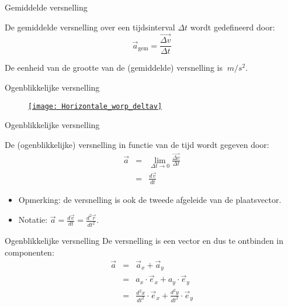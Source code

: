 \begin{frame}{Gemiddelde versnelling}
\begin{block}{}
De gemiddelde versnelling over een tijdsinterval $\Delta t$ wordt gedefineerd door:
\begin{displaymath}
	\vec{a}_{\text{gem}}=\frac{\vec{\Delta v}}{\Delta t}
\end{displaymath}
\end{block}
De eenheid van de grootte van de (gemiddelde) versnelling is $\SI{}{m/s^2}$.
\end{frame}


\begin{frame}{Ogenblikkelijke versnelling}
\begin{figure}
\href{run:./media/Horizontale_worp_deltav.gif}{%
\texttt{[image: Horizontale\_worp\_deltav]}
}
\end{figure}
\end{frame}



\begin{frame}{Ogenblikkelijke versnelling}
\begin{block}{}
De (ogenblikkelijke) versnelling in functie van de tijd wordt gegeven door:
\begin{eqnarray*}
	\vec{a}&=&\lim_{\Delta t\to0}\frac{\vec{\Delta v}}{\Delta t}\\
	&=&\frac{d\vec{v}}{dt}
\end{eqnarray*}
\end{block}
\begin{itemize}
  \item<1-> Opmerking: de versnelling is ook de tweede afgeleide van de plaatsvector.
  \item<2-> Notatie: $\displaystyle\vec{a}=\frac{d\vec{v}}{dt}= \frac{d^2\vec{r}}{dt^2}$.
\end{itemize}
\end{frame}

\begin{frame}{Ogenblikkelijke versnelling}
De versnelling is een vector en dus te ontbinden in componenten:
\begin{eqnarray*}	
\vec{a}&=&\vec{a}_x+ \vec{a}_y\\
&=&a_x\cdot\vec{e}_x+a_y\cdot\vec{e}_y\\
&=&\frac{d^2x}{dt^2}\cdot\vec{e}_x+\frac{d^2y}{dt^2}\cdot\vec{e}_y\\
\end{eqnarray*}
\end{frame}



